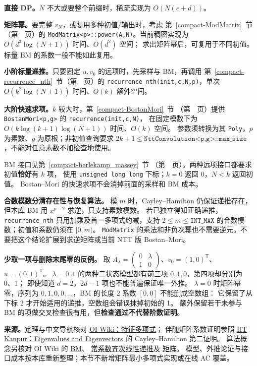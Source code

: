 \textbf{直接 DP。}$N$ 不大或要整个前缀时，稀疏实现为 $O(N(e+d))$。

\textbf{矩阵幂。}要完整 $v_N$，或复用多种初值/输出时，考虑
第~\ref{compact-ModMatrix}~节（第~\pageref{compact-ModMatrix}~页）的
\texttt{ModMatrix<p>::power(A,N)}。当前稠密实现为 $O(d^3\log(N+1))$ 时间、$O(d^2)$ 空间；
求出矩阵幂后，可复用于不同初值。标量 BM 的系数一般不能如此复用。

\textbf{小阶标量递推。}只要固定 $u,v_0$ 的远项时，先采样与 BM，再调用
第~\ref{compact-recurrence_nth}~节（第~\pageref{compact-recurrence_nth}~页）的
\texttt{recurrence\_nth(\allowbreak{}init,c,N,p)}，单次 $O(k^2\log(N+1))$ 时间、$O(k)$ 额外空间。

\textbf{大阶快速求项。}$k$ 较大时，第~\ref{compact-BostanMori}~节
（第~\pageref{compact-BostanMori}~页）提供 \texttt{BostanMori<p,g>} 的 \texttt{recurrence(init,c,N)}，
在固定模数下为 $O(k\log(k+1)\log(N+1))$ 时间、$O(k)$ 空间。
参数须转换为其 \texttt{Poly}，$p$ 为素数、$g$ 为原根；非初值查询要求
$2k+1\le\texttt{NttConvolution<p,g>::max\_size}$，不能对任意素数不加检查地使用。


BM 接口见第~\ref{compact-berlekamp_massey}~节
（第~\pageref{compact-berlekamp_massey}~页）。两种远项接口都要求初值\textbf{恰好}有 $k$ 项，
使用 \texttt{unsigned long long} 下标；$k=0$ 返回 0，$N<k$ 返回初值。
Bostan--Mori 的快速求项不会消掉前面的采样和 BM 成本。

\textbf{合数模数分清存在性与恢复算法。}
模 $m$ 时，Cayley--Hamilton 仍保证递推存在，但本库 BM 用 $x^{p-2}$ 求逆，只支持素数模数。
若已独立得知正确递推，\texttt{recurrence\_nth} 只用加乘及首一多项式约减，支持
$2\le m\le\texttt{INT\_MAX}$ 的合数模数；初值和系数仍须在 $[0,m)$。
\texttt{ModMatrix} 的乘法和非负次幂也不需要逆元。不要把这个结论扩展到求逆矩阵或当前 NTT 版 Bostan--Mori。

\textbf{少取一项与删除末尾零的反例。}
取 $A_\lambda=\begin{pmatrix}0&\lambda\\1&0\end{pmatrix}$、$v_0=(1,0)^{\mathsf T}$、$u=(0,1)^{\mathsf T}$。
$\lambda=0,1$ 的两种二状态模型都有前三项 $0,1,0$，第四项却分别为 0、1；
即使知道 $d=2$，$2d-1$ 项也不能普遍保证唯一外推。
$\lambda=0$ 时矩阵幂零，序列为 $0,1,0,0,\ldots$，BM 的长度 2 系数 $[0,0]$ 不能删成空数组：
它保留了从下标 2 才开始适用的递推，空数组会错误抹掉初始的 1。
额外保留若干未参与 BM 的项做交叉检查很有用，但\textbf{检查通过不代替阶数证明}。

\textbf{来源。}定理与中文导航核对
\href{https://oi-wiki.org/math/linear-algebra/char-poly/}{OI Wiki：特征多项式}；
伴随矩阵系数证明参照
\href{https://home.iitk.ac.in/~rksr/html/02MAT3.htm}{IIT Kanpur：Eigenvalues and Eigenvectors} 的 Cayley--Hamilton 第二证明。
算法概念另核对 OI Wiki 的
\href{https://oi-wiki.org/math/berlekamp-massey/}{BM}、
\href{https://oi-wiki.org/math/poly/linear-recurrence/}{常系数齐次线性递推}及
\href{https://oi-wiki.org/math/linear-algebra/matrix/}{矩阵}。
模型、外推论证与接口成本按本库重新整理；本节不新增矩阵最小多项式实现或在线 AC 覆盖。
